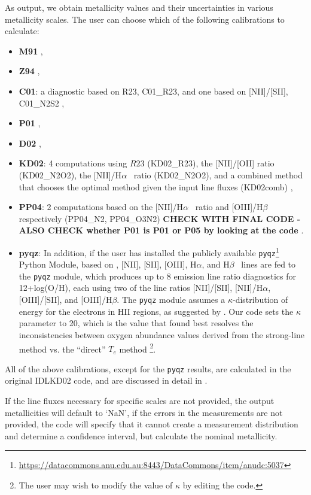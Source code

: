 \documentclass{emulateapj}
\newcommand{\ha}{H$\alpha$}
\newcommand{\hb}{H$\beta$}
\begin{document}
As output, we obtain metallicity values and their uncertainties in various metallicity scales. The user can choose which of the following calibrations to calculate: 
\begin{itemize}
\item {\bf M91} \citep{mcgaugh91}, 
\item {\bf Z94} \citep{zaritsky94}, 
\item {\bf C01}: a diagnostic based on R23, C01\_R23, and one based on [NII]/[SII], C01\_N2S2  \citep{charlot01}, %
\item {\bf P01} \citep{pilyugin01},
\item {\bf D02} \citep{denicolo02},
\item {\bf KD02}: 4 computations using $R23$ (KD02\_R23), the [NII]/[OII] ratio (KD02\_N2O2), the [NII]/\ha~ ratio (KD02\_N2O2), and a combined method that chooses the optimal method given the input line fluxes (KD02comb) \citep{kewley02},
\item {\bf PP04}: 2 computations based on the [NII]/\ha~ ratio and [OIII]/\hb~ respectively (PP04\_N2, PP04\_O3N2) \textbf{CHECK WITH FINAL CODE - ALSO CHECK whether P01 is P01 or P05 by looking at the code} \citep{pettini04}.
\item {\bf pyqz}: In addition, if the user has installed the publicly available \verb=pyqz=\footnote{\url{https://datacommons.anu.edu.au:8443/DataCommons/item/anudc:5037}} Python Module, based on \citet{dopita13}, [NII], [SII], [OIII], \ha, and \hb~ lines are fed to the \verb=pyqz= module, which produces up to 8 emission line ratio diagnostics for  12+log(O/H), each using two of the line ratios [NII]/[SII], [NII]/\ha, [OIII]/[SII], and [OIII]/\hb. The \verb=pyqz= module assumes a $\kappa$-distribution of energy for the electrons in HII regions, as suggested by \citet{nicholls12}. Our code sets the $\kappa$ parameter to 20, which is the value that \citet{dopita13} found best resolves the inconsistencies between oxygen abundance values derived from the strong-line method vs. the ``direct'' $T_e$ method \footnote{The user may wish to modify the value of $\kappa$ by editing the code.}. 
\end{itemize}

All of the above calibrations, except for the \verb=pyqz= results, are calculated in the original IDLKD02 code, and are discussed in detail in \citet{kewley02,kewley08}. 

If the line fluxes necessary for specific scales are not provided, the output  metallicities will default to `NaN', if the errors in the measurements are not provided, the code will specify that it cannot create a measurement distribution and determine a confidence interval, but calculate the nominal metallicity.
\end{document}

